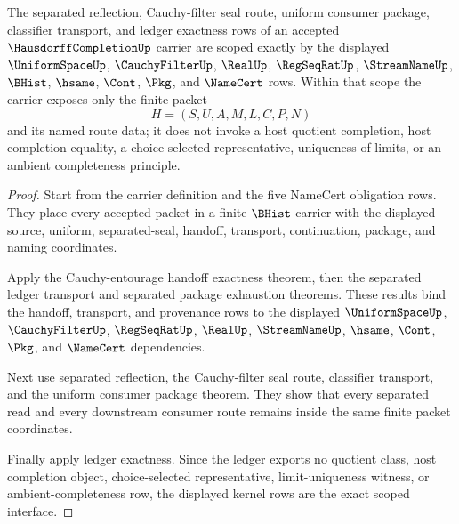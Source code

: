 \begin{theorem}
\label{thm:hausdorff-completion-scoped-kernel-interface}
The separated reflection, Cauchy-filter seal route, uniform consumer package, classifier transport, and ledger exactness rows of an accepted $\HausdorffCompletionUp$ carrier are scoped exactly by the displayed $\UniformSpaceUp$, $\CauchyFilterUp$, $\RealUp$, $\RegSeqRatUp$, $\StreamNameUp$, $\BHist$, $\hsame$, $\Cont$, $\Pkg$, and $\NameCert$ rows. Within that scope the carrier exposes only the finite packet
$$
H=(S,U,A,M,L,C,P,N)
$$
and its named route data; it does not invoke a host quotient completion, host completion equality, a choice-selected representative, uniqueness of limits, or an ambient completeness principle.
\end{theorem}
\begin{proof}
Start from the carrier definition and the five NameCert obligation rows. They place every accepted packet in a finite $\BHist$ carrier with the displayed source, uniform, separated-seal, handoff, transport, continuation, package, and naming coordinates.

Apply the Cauchy-entourage handoff exactness theorem, then the separated ledger transport and separated package exhaustion theorems. These results bind the handoff, transport, and provenance rows to the displayed $\UniformSpaceUp$, $\CauchyFilterUp$, $\RegSeqRatUp$, $\RealUp$, $\StreamNameUp$, $\hsame$, $\Cont$, $\Pkg$, and $\NameCert$ dependencies.

Next use separated reflection, the Cauchy-filter seal route, classifier transport, and the uniform consumer package theorem. They show that every separated read and every downstream consumer route remains inside the same finite packet coordinates.

Finally apply ledger exactness. Since the ledger exports no quotient class, host completion object, choice-selected representative, limit-uniqueness witness, or ambient-completeness row, the displayed kernel rows are the exact scoped interface.
\end{proof}

